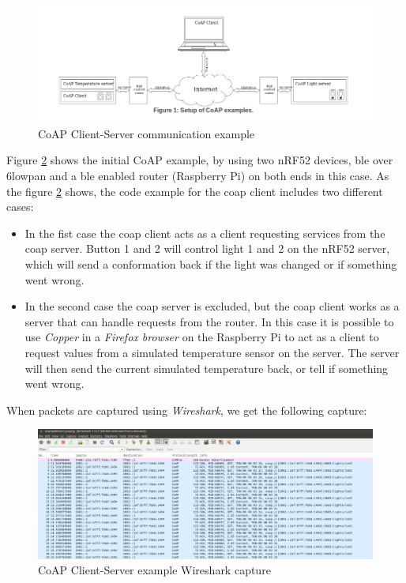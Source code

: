 \begin{figure}[h]
    \centering
    \includegraphics[scale=0.47]{CoAPExample.png}    
    \caption{CoAP Client-Server communication example}
    \label{fig:CoAPexample1}
\end{figure}

Figure \ref{fig:CoAPexample1} shows the initial CoAP example, by using two nRF52 devices, \gls{ble} over \gls{6lowpan} and a \gls{ble} enabled router (Raspberry Pi) on both ends in this case. As the figure \ref{fig:CoAPexample1} shows, the code example for the \gls{coap} client includes two different cases: 

\begin{itemize}
  \item In the fist case the \gls{coap} client acts as a client requesting services from the \gls{coap} server. Button 1 and 2 will control light 1 and 2 on the nRF52 server, which will send a conformation back if the light was changed or if something went wrong.
  \item In the second case the \gls{coap} server is excluded, but the \gls{coap} client works as a server that can handle requests from the router. In this case it is possible to use \textit{Copper} in a \textit{Firefox browser} on the Raspberry Pi to act as a client to request values from a simulated temperature sensor on the server. The server will  then send the current simulated temperature back, or tell if something went wrong. 
\end{itemize} 

When packets are captured using \textit{Wireshark}, we get the following capture: 

\begin{figure}[h]
    \centering
    \includegraphics[scale=0.27]{CoapEx1captureCropped2.png}    
    \caption{CoAP Client-Server example Wireshark capture}
    \label{fig:CoAPexample1}
\end{figure}


